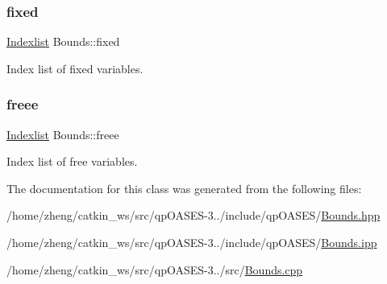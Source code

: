 \subsubsection{\texorpdfstring{fixed}{fixed}}
{\footnotesize\ttfamily \hyperlink{class_indexlist}{Indexlist} Bounds\+::fixed\hspace{0.3cm}{\ttfamily [protected]}}

Index list of fixed variables. \mbox{\label{class_bounds_a0e915647e5ef1a3a48f17fea73ccf03f}} 
\subsubsection{\texorpdfstring{freee}{freee}}
{\footnotesize\ttfamily \hyperlink{class_indexlist}{Indexlist} Bounds\+::freee\hspace{0.3cm}{\ttfamily [protected]}}

Index list of free variables. 

The documentation for this class was generated from the following files\+:\begin{DoxyCompactItemize}
\item 
/home/zheng/catkin\+\_\+ws/src/qp\+O\+A\+S\+E\+S-\/3../include/qp\+O\+A\+S\+E\+S/\hyperlink{_bounds_8hpp}{Bounds.\+hpp}\item 
/home/zheng/catkin\+\_\+ws/src/qp\+O\+A\+S\+E\+S-\/3../include/qp\+O\+A\+S\+E\+S/\hyperlink{_bounds_8ipp}{Bounds.\+ipp}\item 
/home/zheng/catkin\+\_\+ws/src/qp\+O\+A\+S\+E\+S-\/3../src/\hyperlink{_bounds_8cpp}{Bounds.\+cpp}\end{DoxyCompactItemize}

